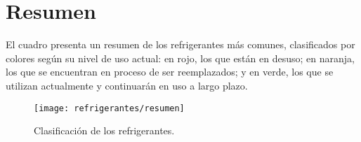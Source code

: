 \section{Resumen}

El cuadro presenta un resumen de los refrigerantes más comunes, clasificados por colores según su nivel de uso actual: en rojo, los que están en desuso; en naranja, los que se encuentran en proceso de ser reemplazados; y en verde, los que se utilizan actualmente y continuarán en uso a largo plazo.
\begin{figure}[h]
	\centering
	\caption{Clasificación de los refrigerantes.}
	\texttt{[image: refrigerantes/resumen]}
\end{figure}
